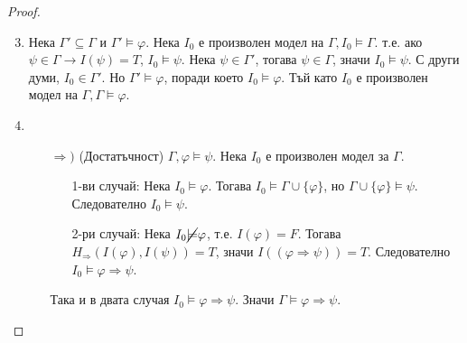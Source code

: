 \documentclass{article}
\def\Proofs{1}
\begin{document}
\begin{prop}
\ifcase\Proofs\or
\begin{proof}
$\ $
\begin{enumerate}
\setcounter{enumi}{2}
\item Нека $\Gamma' \subseteq \Gamma$ и $\Gamma' \models \varphi$. Нека $I_0$ е произволен модел на $\Gamma, I_0 \models \Gamma$. т.е. ако $\psi \in \Gamma \rightarrow I(\psi) = T$, $I_0 \models \psi$. Нека $\psi \in \Gamma'$, тогава $\psi \in \Gamma$, значи $I_0 \models \psi$. С други думи, $I_0 \in \Gamma'$. Но $\Gamma' \models \varphi$, поради което $I_0 \models \varphi$. Тъй като $I_0$ е произволен модел на $\Gamma, \Gamma \models \varphi$.
\item 
\begin{itemize}
\item[$\Rightarrow)$](Достатъчност) $\Gamma, \varphi \models \psi$. Нека $I_0$ е произволен модел за $\Gamma$.
\begin{itemize}
\item[1-ви случай:] Нека $I_0 \models \varphi$. Тогава $I_0 \models \Gamma \cup \{\varphi\}$, но $\Gamma \cup \{\varphi\} \models \psi$. Следователно $I_0 \models \psi$.
\item[2-ри случай:] Нека $I_0 \cancel{\models} \varphi$, т.е. $I(\varphi) = F$. Тогава $H_\Rightarrow(I(\varphi), I(\psi)) = T$, значи $I((\varphi \Rightarrow \psi)) = T$. Следователно $I_0 \models \varphi \Rightarrow \psi$.
\end{itemize}
Така и в двата случая $I_0 \models \varphi \Rightarrow \psi$. Значи $\Gamma \models \varphi \Rightarrow \psi$.


\end{itemize}
\end{enumerate}
\end{proof}
\end{prop}
\end{document}
